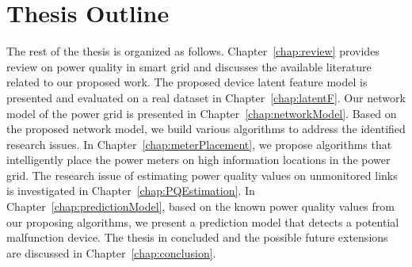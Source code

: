 \section{Thesis Outline}
The rest of the thesis is organized as follows. Chapter~\ref{chap:review} provides review on power quality in smart grid and discusses the available literature related to our proposed work. The proposed device latent feature model is presented and evaluated on a real dataset in Chapter~\ref{chap:latentF}. Our network model of the power grid is presented in Chapter~\ref{chap:networkModel}. Based on the proposed network model, we build various algorithms to address the identified research issues. In Chapter~\ref{chap:meterPlacement}, we propose algorithms that intelligently place the power meters on high information locations in the power grid. The research issue of estimating power quality values on unmonitored links is investigated in Chapter~\ref{chap:PQEstimation}. In Chapter~\ref{chap:predictionModel}, based on the known power quality values from our proposing algorithms, we present a prediction model that detects a potential malfunction device. The thesis in concluded and the possible future extensions are discussed in Chapter~\ref{chap:conclusion}.